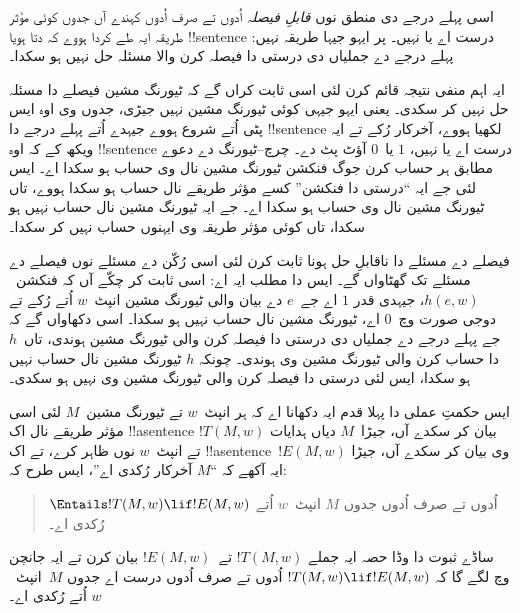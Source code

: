\documentclass[../../../include/open-logic-section]{subfiles}
\begin{document}

اسی پہلے درجے دی منطق نوں \emph{قابلِ فیصلہ} اُدوں تے
صرف اُدوں کہندے آں جدوں کوئی مؤثر طریقہ ایہ طے کردا
ہووے کہ دتا ہویا !!{sentence} درست اے یا نہیں۔ پر ایہو
جیہا طریقہ نہیں: پہلے درجے دے جملیاں دی درستی دا فیصلہ کرن
والا مسئلہ حل نہیں ہو سکدا۔

ایہ اہم منفی نتیجہ قائم کرن لئی اسی ثابت کراں گے کہ
ٹیورنگ مشین فیصلے دا مسئلہ حل نہیں کر سکدی۔ یعنی
ایہو جیہی کوئی ٹیورنگ مشین نہیں جیڑی، جدوں وی اوہ
ایس پٹی اُتے شروع ہووے جیہدے اُتے پہلے درجے دا !!{sentence}
لکھیا ہووے، آخرکار رُکے تے ایہ ویکھ کے کہ اوہ !!{sentence}
درست اے یا نہیں، $1$ یا~$0$ آؤٹ پٹ دے۔ چرچ--ٹیورنگ دے
دعوے مطابق ہر حساب کرن جوگ فنکشن ٹیورنگ مشین نال
وی حساب ہو سکدا اے۔ ایس لئی جے ایہ “درستی دا
فنکشن” کسے مؤثر طریقے نال حساب ہو سکدا ہووے،
تاں ٹیورنگ مشین نال وی حساب ہو سکدا اے۔ جے ایہ
ٹیورنگ مشین نال حساب نہیں ہو سکدا، تاں کوئی مؤثر
طریقہ وی ایہنوں حساب نہیں کر سکدا۔

فیصلے دے مسئلے دا ناقابلِ حل ہونا ثابت کرن لئی
اسی رُکّن دے مسئلے نوں فیصلے دے مسئلے تک گھٹاواں گے۔
ایس دا مطلب ایہ اے: اسی ثابت کر چکّے آں کہ فنکشن~$h(e,w)$،
جیہدی قدر $1$ اے جے~$e$ دے بیان والی ٹیورنگ مشین
انپٹ~$w$ اُتے رُکے تے دوجی صورت وچ~$0$ اے،
ٹیورنگ مشین نال حساب نہیں ہو سکدا۔ اسی دکھاواں گے کہ
جے پہلے درجے دے جملیاں دی درستی دا فیصلہ کرن والی ٹیورنگ مشین ہوندی،
تاں~$h$ دا حساب کرن والی ٹیورنگ مشین وی ہوندی۔
چونکہ $h$ ٹیورنگ مشین نال حساب نہیں ہو سکدا،
ایس لئی درستی دا فیصلہ کرن والی ٹیورنگ مشین
وی نہیں ہو سکدی۔

ایس حکمتِ عملی دا پہلا قدم ایہ دکھانا اے کہ ہر
انپٹ~$w$ تے ٹیورنگ مشین~$M$ لئی اسی مؤثر
طریقے نال اک !!a{sentence} $!T(M, w)$ بیان
کر سکدے آں، جیڑا~$M$ دیاں ہدایات تے
انپٹ~$w$ نوں ظاہر کرے، تے اک !!a{sentence}~$!E(M, w)$
وی بیان کر سکدے آں، جیڑا ایہ آکھے کہ “$M$
آخرکار رُکدی اے”، ایس طرح کہ:
\begin{quote}
  $\Entails !T(M, w) \lif !E(M,w)$ اُدوں تے صرف اُدوں جدوں $M$
  انپٹ~$w$ اُتے رُکدی اے۔
\end{quote}
ساڈے ثبوت دا وڈا حصہ ایہ جملے $!T(M, w)$
تے~$!E(M, w)$ بیان کرن تے ایہ جانچن وچ
لگے گا کہ $!T(M, w) \lif !E(M, w)$ اُدوں تے صرف
اُدوں درست اے جدوں $M$~انپٹ~$w$ اُتے رُکدی اے۔
\end{document}

